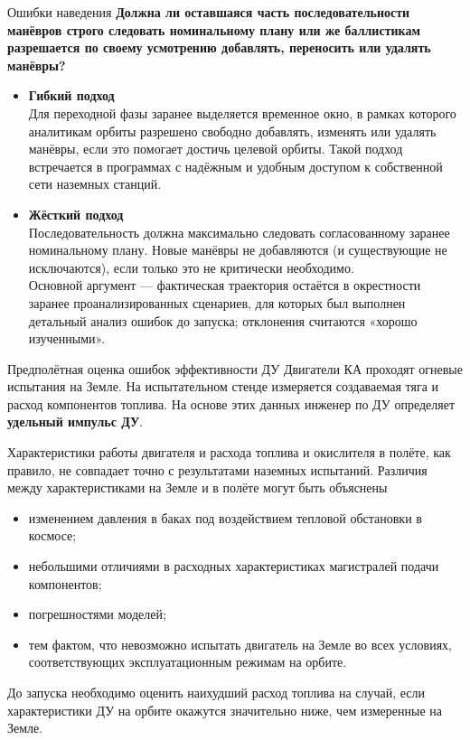 \documentclass[8pt]{beamer}
\begin{document}
\begin{frame}{Ошибки наведения}
\textbf{Должна ли оставшаяся часть последовательности манёвров строго следовать номинальному плану или же баллистикам разрешается по своему усмотрению добавлять, переносить или удалять манёвры?} \\
\smallskip
\begin{itemize}
    \item \textbf{Гибкий подход} \\ 
    Для переходной фазы заранее выделяется временное окно, в рамках которого аналитикам орбиты разрешено свободно добавлять, изменять или удалять манёвры, если это помогает достичь целевой орбиты. Такой подход встречается в программах с надёжным и удобным доступом к собственной сети наземных станций.

    \item \textbf{Жёсткий подход} \\
    Последовательность должна максимально следовать согласованному заранее номинальному плану. Новые манёвры не добавляются (и существующие не исключаются), если только это не критически необходимо.  \\
    Основной аргумент — фактическая траектория остаётся в окрестности заранее проанализированных сценариев, для которых был выполнен детальный анализ ошибок до запуска; отклонения считаются «хорошо изученными».
\end{itemize}
\end{frame}

\begin{frame}{Предполётная оценка ошибок эффективности ДУ}
Двигатели КА проходят огневые испытания на Земле. На испытательном стенде измеряется создаваемая тяга и расход компонентов топлива. На основе этих данных инженер по ДУ определяет \textbf{удельный импульс ДУ}.

Характеристики работы двигателя и расхода топлива и окислителя в полёте, как правило, не совпадает точно с результатами наземных испытаний. Различия между характеристиками на Земле и в полёте могут быть объяснены
\begin{itemize}
    \item изменением давления в баках под воздействием тепловой обстановки в космосе;
    \item небольшими отличиями в расходных характеристиках магистралей подачи компонентов;
    \item погрешностями моделей;
    \item тем фактом, что невозможно испытать двигатель на Земле во всех условиях, соответствующих эксплуатационным режимам на орбите.
\end{itemize}
До запуска необходимо оценить наихудший расход топлива на случай, если характеристики ДУ на орбите окажутся значительно ниже, чем измеренные на Земле.
\end{frame}
\end{document}
